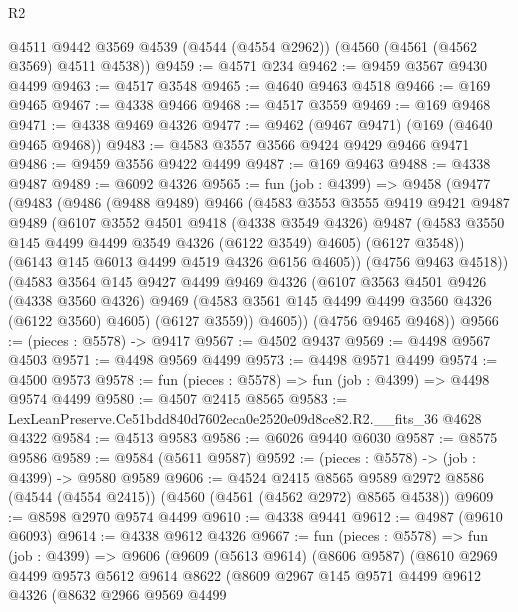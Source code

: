 \begin{lexlean}{R2}
\begin{coremodule}
    @4511
    @9442
    @3569
    @4539
    (@4544 (@4554 @2962))
    (@4560 (@4561 (@4562 @3569) @4511 @4538))
@9459 := @4571 @234
@9462 := @9459 @3567 @9430 @4499
@9463 := @4517 @3548
@9465 := @4640 @9463 @4518
@9466 := @169 @9465
@9467 := @4338 @9466
@9468 := @4517 @3559
@9469 := @169 @9468
@9471 := @4338 @9469 @4326
@9477 := @9462 (@9467 @9471) (@169 (@4640 @9465 @9468))
@9483 := @4583 @3557 @3566 @9424 @9429 @9466 @9471
@9486 := @9459 @3556 @9422 @4499
@9487 := @169 @9463
@9488 := @4338 @9487
@9489 := @6092 @4326
@9565 := fun (job : @4399) =>
  @9458
    (@9477
      (@9483
        (@9486
          (@9488 @9489)
          @9466
          (@4583
            @3553
            @3555
            @9419
            @9421
            @9487
            @9489
            (@6107
              @3552
              @4501
              @9418
              (@4338 @3549 @4326)
              @9487
              (@4583 @3550 @145 @4499 @4499 @3549 @4326 (@6122 @3549) @4605)
              (@6127 @3548))
            (@6143 @145 @6013 @4499 @4519 @4326 @6156 @4605))
          (@4756 @9463 @4518))
        (@4583
          @3564
          @145
          @9427
          @4499
          @9469
          @4326
          (@6107
            @3563
            @4501
            @9426
            (@4338 @3560 @4326)
            @9469
            (@4583 @3561 @145 @4499 @4499 @3560 @4326 (@6122 @3560) @4605)
            (@6127 @3559))
          @4605))
      (@4756 @9465 @9468))
@9566 := (pieces : @5578) -> @9417
@9567 := @4502 @9437
@9569 := @4498 @9567 @4503
@9571 := @4498 @9569 @4499
@9573 := @4498 @9571 @4499
@9574 := @4500 @9573
@9578 := fun (pieces : @5578) => fun (job : @4399) => @4498 @9574 @4499
@9580 := @4507 @2415 @8565
@9583 := LexLeanPreserve.Ce51bdd840d7602eca0e2520e09d8ce82.R2.__fits_36 @4628 @4322
@9584 := @4513 @9583
@9586 := @6026 @9440 @6030
@9587 := @8575 @9586
@9589 := @9584 (@5611 @9587)
@9592 := (pieces : @5578) -> (job : @4399) -> @9580 @9589
@9606 := @4524
    @2415
    @8565
    @9589
    @2972
    @8586
    (@4544 (@4554 @2415))
    (@4560 (@4561 (@4562 @2972) @8565 @4538))
@9609 := @8598 @2970 @9574 @4499
@9610 := @4338 @9441
@9612 := @4987 (@9610 @6093)
@9614 := @4338 @9612 @4326
@9667 := fun (pieces : @5578) =>
  fun (job : @4399) =>
  @9606
    (@9609
      (@5613 @9614)
      (@8606 @9587)
      (@8610
        @2969
        @4499
        @9573
        @5612
        @9614
        @8622
        (@8609
          @2967
          @145
          @9571
          @4499
          @9612
          @4326
          (@8632
            @2966
            @9569
            @4499

\end{coremodule}
\end{lexlean}
